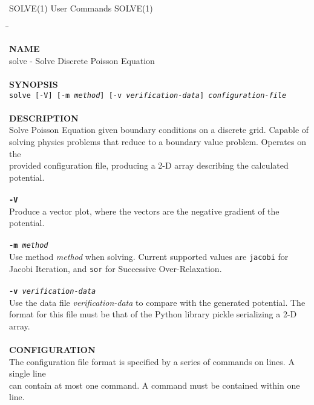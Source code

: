 \begin{flushleft}
	SOLVE(1)
	\hfill User Commands \hfill
	SOLVE(1)
\end{flushleft}

\begin{tabbing}
\hspace{30pt}\=\hspace{30pt}\=\kill

\textbf{NAME}\\
\> solve - Solve Discrete Poisson Equation\\
\\
\textbf{SYNOPSIS}\\
	\> \texttt{solve [-V] [-m \textit{method}] [-v \textit{verification-data}] \textit{configuration-file}}\\
	\\
\textbf{DESCRIPTION}\\
\> Solve Poisson Equation given boundary conditions on a discrete grid. Capable of\\
\> solving physics problems that reduce to a boundary value problem. Operates on the\\
\> provided configuration file, producing a 2-D array describing the calculated potential.\\
\\
\> \texttt{\textbf{-V}} \\
\> \> Produce a vector plot, where the vectors are the negative gradient of the potential.\\
\\
	\> \texttt{\textbf{-m} \textit{method}} \\
	\> \> Use method \textit{method} when solving. Current supported values are \texttt{jacobi} for\\
	\> \> Jacobi Iteration, and \texttt{sor} for Successive Over-Relaxation.\\
\\
	\> \texttt{\textbf{-v} \textit{verification-data}} \\
	\> \> Use the data file \textit{verification-data} to compare with the generated potential. The \\
	\> \> format for this file must be that of the Python library pickle serializing a 2-D array.\\
\\
\textbf{CONFIGURATION}\\
\> The configuration file format is specified by a series of commands on lines. A single line\\
\> can contain at most one command. A command must be contained within one line.\\

\end{tabbing}
